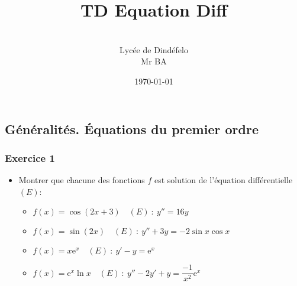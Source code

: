 \documentclass[12pt]{article}
\author{\\Lycée de Dindéfelo\\Mr BA}
\title{\textbf{TD Equation Diff}}
\date{\today}
\begin{document}
\maketitle
\newpage
\subsection*{Généralités. Équations du premier ordre}
\subsubsection*{Exercice 1}
\begin{itemize}
    \item Montrer que chacune des fonctions \(f\) est solution de l'équation différentielle \((E)\):
    \begin{itemize}
        \item \(f(x)=\cos(2x+3)\quad(E)\ :\  y''=16y\)
        \item \(f(x)=\sin(2x)\quad(E)\ :\  y''+3y=-2\sin x\cos x\)
        \item \(f(x)=x\mathrm{e}^{x}\quad(E)\ :\  y'-y=\mathrm{e}^{x}\)
        \item \(f(x)=\mathrm{e}^{x}\ln x\quad(E)\ :\  y''-2y'+y=\dfrac{-1}{x^{2}}\mathrm{e}^{x}\)
    \end{itemize}
\end{itemize}
\end{document}

